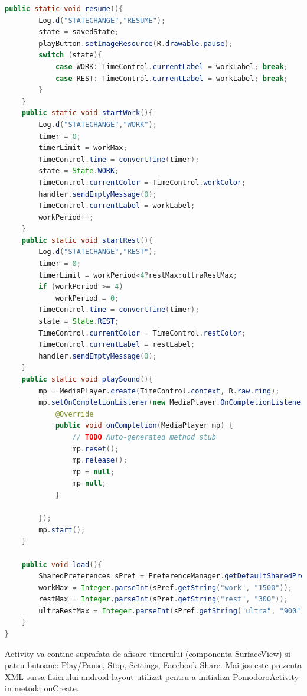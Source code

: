 \documentclass[12pt]{article}
\begin{document}
\begin{lstlisting}[language=java, caption={Fisierul PomodoroActivity.java}, label=list2]
    public static void resume(){
        Log.d("STATECHANGE","RESUME");
        state = savedState;
        playButton.setImageResource(R.drawable.pause);
        switch (state){
            case WORK: TimeControl.currentLabel = workLabel; break;
            case REST: TimeControl.currentLabel = workLabel; break;
        }
    }
    public static void startWork(){
        Log.d("STATECHANGE","WORK");
        timer = 0;
        timerLimit = workMax;
        TimeControl.time = convertTime(timer);
        state = State.WORK;
        TimeControl.currentColor = TimeControl.workColor;
        handler.sendEmptyMessage(0);
        TimeControl.currentLabel = workLabel;
        workPeriod++;
    }
    public static void startRest(){
        Log.d("STATECHANGE","REST");
        timer = 0;
        timerLimit = workPeriod<4?restMax:ultraRestMax;
        if (workPeriod >= 4)
            workPeriod = 0;
        TimeControl.time = convertTime(timer);
        state = State.REST;
        TimeControl.currentColor = TimeControl.restColor;
        TimeControl.currentLabel = restLabel;
        handler.sendEmptyMessage(0);
    }
    public static void playSound(){
        mp = MediaPlayer.create(TimeControl.context, R.raw.ring);
        mp.setOnCompletionListener(new MediaPlayer.OnCompletionListener() {
            @Override
            public void onCompletion(MediaPlayer mp) {
                // TODO Auto-generated method stub
                mp.reset();
                mp.release();
                mp = null;
                mp=null;
            }

        });
        mp.start();
    }

    public void load(){
        SharedPreferences sPref = PreferenceManager.getDefaultSharedPreferences(this);
        workMax = Integer.parseInt(sPref.getString("work", "1500"));
        restMax = Integer.parseInt(sPref.getString("rest", "300"));
        ultraRestMax = Integer.parseInt(sPref.getString("ultra", "900"));
    }
}
\end{lstlisting}
Activity va contine suprafata de afisare timerului (componenta SurfaceView) si patru butoane: Play/Pause, Stop, Settings, Facebook Share. Mai jos este prezenta XML-sursa fisierului android layout utilizat pentru a initializa PomodoroActivity in metoda onCreate.\\\\
\end{document}
